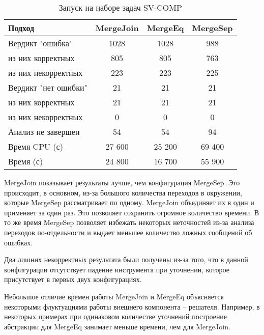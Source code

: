 \begin{center}
  \begin{table}[h]\footnotesize
  	\label{table-sv-comp-merge}
    \caption{Запуск на наборе задач SV-COMP}
    \begin{tabular}{ | l | c | c | c | }
      \hline
      Подход         				& MergeJoin & MergeEq 	& MergeSep   \\ \hline
      Вердикт "ошибка" 				& 1028    	& 1028		& 988         \\ 
  \hspace{0.5cm} из них корректных 	& 805 		& 805 		& 763      \\ 
  \hspace{0.5cm} из них некорректных & 223 		& 223 		& 225        \\ \hline
      Вердикт "нет ошибки"  		& 21      	& 21        & 21       \\ 
  \hspace{0.5cm} из них корректных 	& 21 		& 21    	& 21        \\
  \hspace{0.5cm} из них некорректных & 0 		& 0    		& 0         \\ \hline
      Анализ не завершен       		& 54     	& 54        & 94       \\ \hline
      Время CPU (с)   				& 27 600 	& 25 200    & 69 400    \\ 
      Время (с)  					& 24 800 	& 16 700    & 55 900     \\
      \hline
    \end{tabular}
  \end{table}
\end{center}

MergeJoin показывает результаты лучше, чем конфигурация MergeSep.
Это происходит, в основном, из-за большого количества переходов в окружении, которые MergeSep рассматривает по одному.
MergeJoin объединяет их в один и применяет за один раз. Это позволяет сохранить огромное количество времени.
В то же время MergeSep позволяет избежать некоторых неточностей из-за анализа переходов по-отдельности и выдает меньшее количество ложных сообщений об ошибках. 

Два лишних некорректных результата были получены из-за того, что в данной конфигурации отсутствует падение инструмента при уточнении, которое присутствует в первых двух конфигурациях.

Небольшое отличие времен работы MergeJoin и MergeEq объясняется некоторыми флуктуациями работы внешнего компонента -- решателя. 
Например, в некоторых примерах при одинаковом количестве уточнений построение абстракции для MergeEq занимает меньше времени, чем для MergeJoin.


